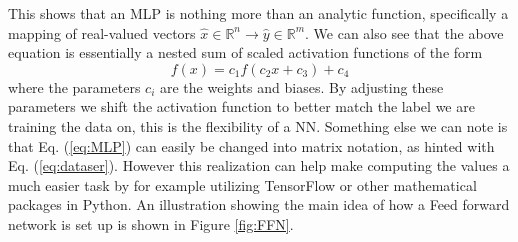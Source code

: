 \documentclass[14pt, a4paper]{book}
\begin{document}
This shows that an MLP is nothing more than an analytic function, specifically a mapping of real-valued vectors $\hat{x}\in\mathbb{R}^n\rightarrow\hat{y}\in\mathbb{R}^m$. We can also see that the above equation is essentially 
a nested sum of scaled activation functions of the form
$$
  f(x)=c_1f(c_2x+c_3)+c_4  
$$
where the parameters $c_i$ are the weights and biases. By adjusting these parameters we shift the activation function to better match the label we are training the data on, this is the flexibility of a NN. 
Something else we can note is that Eq. (\ref{eq:MLP}) can easily be changed into matrix notation, as hinted with Eq. (\ref{eq:dataser}). However this realization can help make computing the values a much easier 
task by for example utilizing TensorFlow or other mathematical packages in Python. An illustration showing the main idea of how a Feed forward network is set up is shown in Figure \ref{fig:FFN}.
\end{document}
